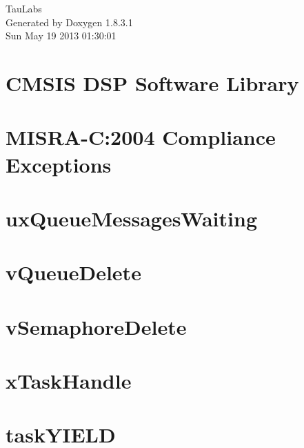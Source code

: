 \documentclass{book}
\begin{document}
\hypersetup{pageanchor=false,citecolor=blue}
\begin{titlepage}
\vspace*{7cm}
\begin{center}
{\Large Tau\-Labs }\\
\vspace*{1cm}
{\large Generated by Doxygen 1.8.3.1}\\
\vspace*{0.5cm}
{\small Sun May 19 2013 01:30:01}\\
\end{center}
\end{titlepage}
\clearemptydoublepage
{}
\tableofcontents
\clearemptydoublepage
{}
\hypersetup{pageanchor=true,citecolor=blue}
\chapter{C\-M\-S\-I\-S D\-S\-P Software Library}
\label{index}\hypertarget{index}{}
\chapter{M\-I\-S\-R\-A-\/\-C\-:2004 Compliance Exceptions}
\label{CMSIS_MISRA_Exceptions}
\hypertarget{CMSIS_MISRA_Exceptions}{}

\chapter{ux\-Queue\-Messages\-Waiting}
\label{uxQueueMessagesWaiting}
\hypertarget{uxQueueMessagesWaiting}{}

\chapter{v\-Queue\-Delete}
\label{vQueueDelete}
\hypertarget{vQueueDelete}{}

\chapter{v\-Semaphore\-Delete}
\label{vSemaphoreDelete}
\hypertarget{vSemaphoreDelete}{}

\chapter{x\-Task\-Handle}
\label{xTaskHandle}
\hypertarget{xTaskHandle}{}

\chapter{task\-Y\-I\-E\-L\-D}
\label{taskYIELD}
\hypertarget{taskYIELD}{}

\end{document}
